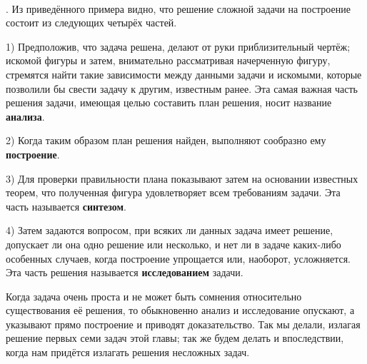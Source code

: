 {\small

\paragraph{}\label{1938/69}
.
Из приведённого примера видно, что решение сложной задачи на построение состоит из следующих четырёх частей.

1) Предположив, что задача решена, делают от руки приблизительный чертёж;
искомой фигуры и затем, внимательно рассматривая начерченную фигуру, стремятся найти такие зависимости между данными задачи и искомыми, которые позволили бы свести задачу к другим, известным ранее.
Эта самая важная часть решения задачи, имеющая целью составить план решения, носит название \textbf{анализа}.

2) Когда таким образом план решения найден, выполняют сообразно ему \textbf{построение}.

3) Для проверки правильности плана показывают затем на основании известных теорем, что полученная фигура удовлетворяет всем требованиям задачи.
Эта часть называется \textbf{синтезом}.

4) Затем задаются вопросом, при всяких ли данных задача имеет решение, допускает ли она одно решение или несколько, и нет ли в задаче каких-либо особенных случаев, когда построение упрощается или, наоборот, усложняется.
Эта часть решения называется \textbf{исследованием} задачи.

Когда задача очень проста и не может быть сомнения относительно существования её решения, то обыкновенно анализ и исследование опускают, а указывают прямо построение и приводят доказательство.
Так мы делали, излагая решение первых семи задач этой главы;
так же будем делать и впоследствии, когда нам придётся излагать решения несложных задач.

}

